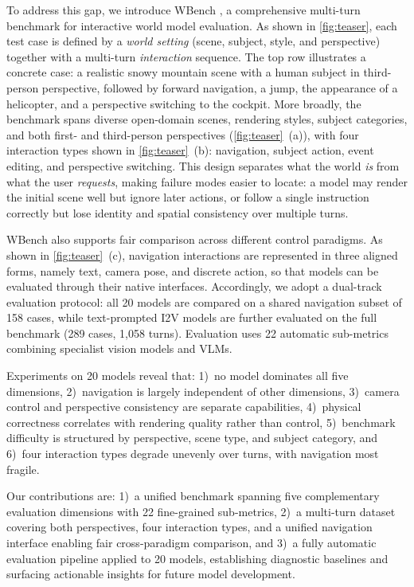 \documentclass{llmxive}
\providecommand{\nummodel}{{20}\xspace}
\providecommand{\numvideo}{289\xspace}
\providecommand{\numturn}{1,058\xspace}
\providecommand{\numnavi}{158\xspace}
\providecommand{\numsubmetric}{{22}\xspace}
\providecommand{\benchmark}{WBench }
\begin{document}
To address this gap, we introduce \benchmark, a comprehensive multi-turn benchmark for interactive world model evaluation. As shown in \cref{fig:teaser}, each test case is defined by a \emph{world setting} (scene, subject, style, and perspective) together with a multi-turn \emph{interaction} sequence. The top row illustrates a concrete case: a realistic snowy mountain scene with a human subject in third-person perspective, followed by forward navigation, a jump, the appearance of a helicopter, and a perspective switching to the cockpit. More broadly, the benchmark spans diverse open-domain scenes, rendering styles, subject categories, and both first- and third-person perspectives (\cref{fig:teaser}~\!(a)), with four interaction types shown in \cref{fig:teaser}~\!(b): navigation, subject action, event editing, and perspective switching. This design separates what the world \emph{is} from what the user \emph{requests}, making failure modes easier to locate: a model may render the initial scene well but ignore later actions, or follow a single instruction correctly but lose identity and spatial consistency over multiple turns.

\benchmark also supports fair comparison across different control paradigms. As shown in \cref{fig:teaser}~\!(c), navigation interactions are represented in three aligned forms, namely text, camera pose, and discrete action, so that models can be evaluated through their native interfaces. Accordingly, we adopt a dual-track evaluation protocol: all \nummodel models are compared on a shared navigation subset of \numnavi cases, while text-prompted I2V models are further evaluated on the full benchmark (\numvideo cases, \numturn turns). Evaluation uses \numsubmetric automatic sub-metrics combining specialist vision models and VLMs.

Experiments on \nummodel models reveal that:
1)~no model dominates all five dimensions,
2)~navigation is largely independent of other dimensions,
3)~camera control and perspective consistency are separate capabilities,
4)~physical correctness correlates with rendering quality rather than control,
5)~benchmark difficulty is structured by perspective, scene type, and subject category, and
6)~four interaction types degrade unevenly over turns, with navigation most fragile.

Our contributions are: 1)~a unified benchmark spanning five complementary evaluation dimensions with \numsubmetric fine-grained sub-metrics, 2)~a multi-turn dataset covering both perspectives, four interaction types, and a unified navigation interface enabling fair cross-paradigm comparison, and 3)~a fully automatic evaluation pipeline applied to \nummodel models, establishing diagnostic baselines and surfacing actionable insights for future model development.
\end{document}
